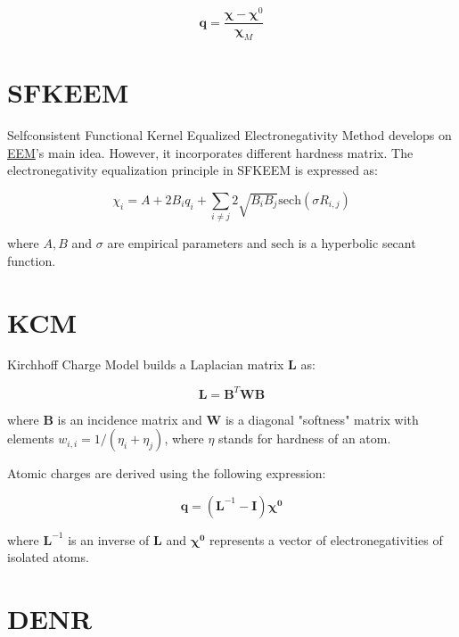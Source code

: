 \documentclass[oneside]{memoir}
\newcommand\ddfrac[2]{\frac{\displaystyle #1}{\displaystyle #2}}
\begin{document}
\begin{equation}
\label{eq:mgc_charges}
\bm{q} = \ddfrac{\bm{\chi} - \bm{\chi}^0}{\bm{\chi}_M}
\end{equation}

\section*{SFKEEM}
\label{sec:methods_sfkeem}

Selfconsistent Functional Kernel Equalized Electronegativity Method \cite{Chaves2006} develops on \hyperref[sec:methods_eem]{EEM}'s main idea. However, it incorporates different hardness matrix. The electronegativity equalization principle in SFKEEM is expressed as:

\begin{equation}
\label{eq:sfkeem_main}
\chi_i = A + 2B_iq_i + \sum_{i \neq j} 2\sqrt{B_iB_j}\mathrm{sech}(\sigma R_{i, j})
\end{equation}

where $A, B$ and $\sigma$ are empirical parameters and $\mathrm{sech}$ is a hyperbolic secant function.

\section*{KCM}
Kirchhoff Charge Model \cite{Yakovenko2008} builds a Laplacian matrix $\bm{L}$ as:

\begin{equation}
\label{eq:ksm_laplacian}
\bm{L} = \bm{B}^T \bm{W} \bm{B}
\end{equation}

where $\bm{B}$ is an incidence matrix and $\bm{W}$ is a diagonal "softness" matrix with elements $w_{i, i} = 1 / (\eta_i + \eta_j)$, where $\eta$ stands for hardness of an atom.

Atomic charges are derived using the following expression:

\begin{equation}
\label{eq:kcm_charges}
\bm{q} = (\bm{L}^{-1} - \bm{I})\bm{\chi^0}
\end{equation}

where $\bm{L}^{-1}$ is an inverse of $\bm{L}$ and $\bm{\chi^0}$ represents a vector of electronegativities of isolated atoms.

\section*{DENR}
\label{sec:methods_denr}
\end{document}
